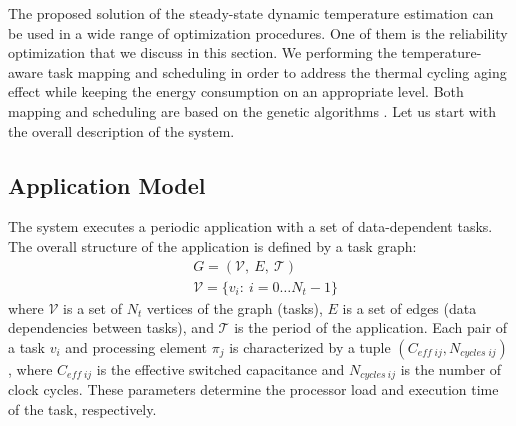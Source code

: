 The proposed solution of the steady-state dynamic temperature estimation can be used in a wide range of optimization procedures. One of them is the reliability optimization that we discuss in this section. We performing the temperature-aware task mapping and scheduling in order to address the thermal cycling aging effect while keeping the energy consumption on an appropriate level. Both mapping and scheduling are based on the genetic algorithms \cite{schmitz2004}. Let us start with the overall description of the system.

\subsection{Application Model}
The system executes a periodic application with a set of data-dependent tasks. The overall structure of the application is defined by a task graph:
\begin{align*}
  & G = (\mathcal{V}, \: E, \: \mathcal{T}) \\
  & \mathcal{V} = \{ v_i: \: i = 0 \dots N_t - 1 \}
\end{align*}
where $\mathcal{V}$ is a set of $N_t$ vertices of the graph (tasks), $E$ is a set of edges (data dependencies between tasks), and $\mathcal{T}$ is the period of the application. Each pair of a task $v_i$ and processing element $\pi_j$ is characterized by a tuple $(C_{eff \; ij}, N_{cycles \; ij})$, where $C_{eff \; ij}$ is the effective switched capacitance and $N_{cycles \: ij}$ is the number of clock cycles. These parameters determine the processor load and execution time of the task, respectively.

